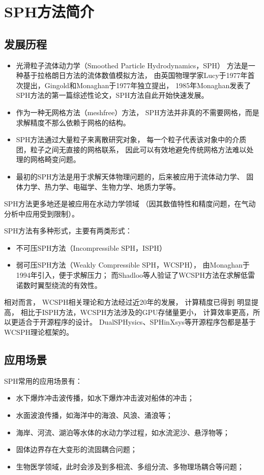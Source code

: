 \section{SPH方法简介}

\subsection{发展历程}

\begin{frame}
    \begin{itemize}
		\item 光滑粒子流体动力学（Smoothed Particle Hydrodynamics，SPH）
		方法是一种基于拉格朗日方法的流体数值模拟方法，
		由英国物理学家Lucy于1977年首次提出，Gingold和Monaghan于1977年独立提出，
		1985年Monaghan发表了SPH方法的第一篇综述性论文，SPH方法自此开始快速发展。

		\item 作为一种无网格方法（meshfree）方法，
		SPH方法并非真的不需要网格，而是求解精度不那么依赖于网格的结构。
	
		\item SPH方法通过大量粒子来离散研究对象，
	    每一个粒子代表该对象中的介质团，粒子之间无直接的网格联系，
		因此可以有效地避免传统网格方法难以处理的网格畸变问题。
	
		\item 最初的SPH方法是用于求解天体物理问题的，后来被应用于流体动力学、
		固体力学、热力学、电磁学、生物力学、地质力学等。
	\end{itemize}
\end{frame}

\begin{frame}
	SPH方法更多地还是被应用在水动力学领域
	（因其数值特性和精度问题，在气动分析中应用受到限制）。

	SPH方法有多种形式，主要有两类形式\cite{_sph_2022}：
	\begin{itemize}
		\item 不可压SPH方法（Incompressible SPH，ISPH）
		\item 弱可压SPH方法（Weakly Compressible SPH，WCSPH），
		由Monaghan于1994年引入，便于求解压力；
		而Shadloo等人验证了WCSPH方法在求解低雷诺数时翼型绕流的有效性。
	\end{itemize}

	相对而言，
	WCSPH相关理论和方法经过近20年的发展，
	计算精度已得到 明显提高，
	相比于ISPH方法，WCSPH方法涉及的GPU存储量更小，
	计算效率更高，所以更适合于开源程序的设计。
	DualSPHysics、SPHinXsys等开源程序包都是基于WCSPH理论框架的。
\end{frame}

\subsection{应用场景}

\begin{frame}
	SPH常用的应用场景有：
	\begin{itemize}
		\item 水下爆炸冲击波传播，如水下爆炸冲击波对船体的冲击；
		\item 水面波浪传播，如海洋中的海浪、风浪、涌浪等；
		\item 海岸、河流、湖泊等水体的水动力学过程，如水流泥沙、悬浮物等；
		\item 固体边界存在大变形的流固耦合问题；
		\item 生物医学领域，此时会涉及到多相流、多组分流、多物理场耦合等问题；
	\end{itemize}
\end{frame}